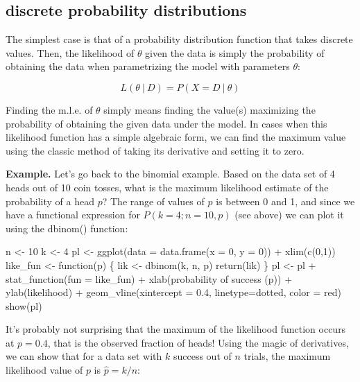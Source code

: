 \documentclass[
  letterpaper,
  DIV=11,
  numbers=noendperiod]{scrreprt}
\newenvironment{Shaded}{\begin{snugshade}}{\end{snugshade}}
\newcommand{\NormalTok}[1]{\textcolor[rgb]{0.00,0.23,0.31}{#1}}
\begin{document}
\subsection{discrete probability
distributions}\label{discrete-probability-distributions}

The simplest case is that of a probability distribution function that
takes discrete values. Then, the likelihood of \(\theta\) given the data
is simply the probability of obtaining the data when parametrizing the
model with parameters \(\theta\):

\[L(\theta \ \vert \ D) = P(X = D \ \vert \ \theta)\]

Finding the m.l.e. of \(\theta\) simply means finding the value(s)
maximizing the probability of obtaining the given data under the model.
In cases when this likelihood function has a simple algebraic form, we
can find the maximum value using the classic method of taking its
derivative and setting it to zero.

\textbf{Example.} Let's go back to the binomial example. Based on the
data set of 4 heads out of 10 coin tosses, what is the maximum
likelihood estimate of the probability of a head \(p\)? The range of
values of \(p\) is between 0 and 1, and since we have a functional
expression for \(P(k=4 ; n=10, p)\) (see above) we can plot it using the
dbinom() function:

\begin{Shaded}
\begin{Highlighting}[]
\NormalTok{n \textless{}{-} 10}
\NormalTok{k \textless{}{-} 4}
\NormalTok{pl \textless{}{-} ggplot(data = data.frame(x = 0, y = 0)) + xlim(c(0,1))}
\NormalTok{like\_fun \textless{}{-} function(p) \{}
\NormalTok{  lik \textless{}{-} dbinom(k, n, p)}
\NormalTok{  return(lik)}
\NormalTok{\}}
\NormalTok{pl \textless{}{-} pl + stat\_function(fun = like\_fun) + }
\NormalTok{  xlab(\textquotesingle{}probability of success (p)\textquotesingle{}) + }
\NormalTok{  ylab(\textquotesingle{}likelihood\textquotesingle{}) +}
\NormalTok{  geom\_vline(xintercept = 0.4, linetype=\textquotesingle{}dotted\textquotesingle{}, color = \textquotesingle{}red\textquotesingle{})}
\NormalTok{show(pl)}
\end{Highlighting}
\end{Shaded}

It's probably not surprising that the maximum of the likelihood function
occurs at \(p=0.4\), that is the observed fraction of heads! Using the
magic of derivatives, we can show that for a data set with \(k\) success
out of \(n\) trials, the maximum likelihood value of \(p\) is
\(\hat p = k/n\):
\end{document}
